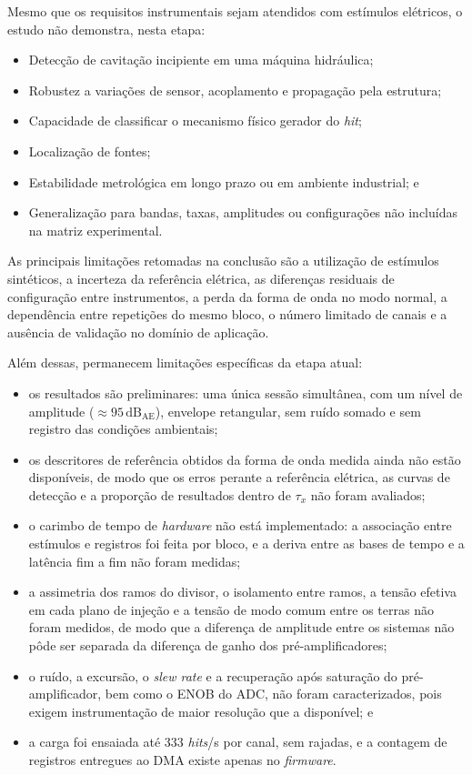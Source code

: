 Mesmo que os requisitos instrumentais sejam atendidos com estímulos elétricos, o estudo não demonstra, nesta etapa:
\begin{itemize}
	\item Detecção de cavitação incipiente em uma máquina hidráulica;
	
	\item Robustez a variações de sensor, acoplamento e propagação pela estrutura;
	
	\item Capacidade de classificar o mecanismo físico gerador do \textit{hit};
	
	\item Localização de fontes;
	
	\item Estabilidade metrológica em longo prazo ou em ambiente industrial; e
	
	\item Generalização para bandas, taxas, amplitudes ou configurações não incluídas na matriz experimental.
\end{itemize}

As principais limitações retomadas na conclusão são a utilização de estímulos sintéticos, a incerteza da referência elétrica, as diferenças residuais de configuração entre instrumentos, a perda da forma de onda no modo normal, a dependência entre repetições do mesmo bloco, o número limitado de canais e a ausência de validação no domínio de aplicação.

Além dessas, permanecem limitações específicas da etapa atual:
\begin{itemize}
	\item os resultados são preliminares: uma única sessão simultânea, com um nível de amplitude (\(\approx 95\,\mathrm{dB}_{\mathrm{AE}}\)), envelope retangular, sem ruído somado e sem registro das condições ambientais;
	\item os descritores de referência obtidos da forma de onda medida ainda não estão disponíveis, de modo que os erros perante a referência elétrica, as curvas de detecção e a proporção de resultados dentro de \(\tau_x\) não foram avaliados;
	\item o carimbo de tempo de \textit{hardware} não está implementado: a associação entre estímulos e registros foi feita por bloco, e a deriva entre as bases de tempo e a latência fim a fim não foram medidas;
	\item a assimetria dos ramos do divisor, o isolamento entre ramos, a tensão efetiva em cada plano de injeção e a tensão de modo comum entre os terras não foram medidos, de modo que a diferença de amplitude entre os sistemas não pôde ser separada da diferença de ganho dos pré-amplificadores;
	\item o ruído, a excursão, o \textit{slew rate} e a recuperação após saturação do pré-amplificador, bem como o ENOB do ADC, não foram caracterizados, pois exigem instrumentação de maior resolução que a disponível; e
	\item a carga foi ensaiada até 333 \textit{hits}/s por canal, sem rajadas, e a contagem de registros entregues ao DMA existe apenas no \textit{firmware}.
\end{itemize}

